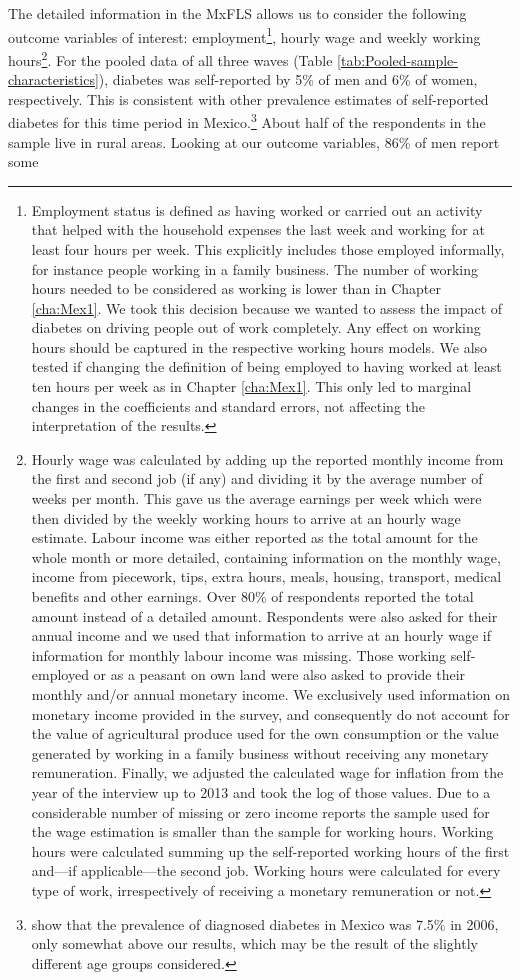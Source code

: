 The detailed information in the \ac{MxFLS} allows us to consider the following outcome variables of interest: employment\footnote{Employment status is defined as having worked or carried out an activity that helped with the household expenses the last week and working for at least four hours per week. This explicitly includes those employed informally, for instance people working in a family business. The number of working hours needed to be considered as working is lower than in Chapter \ref{cha:Mex1}. We took this decision because we wanted to assess the impact of diabetes on driving people out of work completely. Any effect on working hours should be captured in the respective working hours models. We also tested if changing the definition of being employed to having worked at least ten hours per week as in Chapter \ref{cha:Mex1}. This only led to marginal changes in the coefficients and standard errors, not affecting the interpretation of the results.}, hourly wage and weekly working hours\footnote{Hourly wage was calculated by adding up the reported monthly income from the first and second job (if any) and dividing it by the average number of weeks per month. This gave us the average earnings per week which were then divided by the weekly working hours to arrive at an hourly wage estimate. Labour income was either reported as the total amount for the whole month or more detailed, containing information on the monthly wage, income from piecework, tips, extra hours, meals, housing, transport, medical benefits and other earnings. Over 80\% of respondents reported the total amount instead of a detailed amount. Respondents were also asked for their annual income and we used that information to arrive at an hourly wage if information for monthly labour income was missing. Those working self-employed or as a peasant on own land were also asked to provide their monthly and/or annual monetary income. We exclusively used information on monetary income provided in the survey, and consequently do not account for the value of agricultural produce used for the own consumption or the value generated by working in a family business without receiving any monetary remuneration.  Finally, we adjusted the calculated wage for inflation from the year of the interview up to 2013 and took the log of those values. Due to a considerable number of missing or zero income reports the sample used for the wage estimation is smaller than the sample for working hours. Working hours were calculated summing up the self-reported working hours of the first and---if applicable---the second job. Working hours were calculated for every type of work, irrespectively of receiving a monetary remuneration or not.}. For the pooled data of all three waves (Table  \ref{tab:Pooled-sample-characteristics}), diabetes was self-reported by 5\% of men and 6\% of women, respectively. This is consistent with other prevalence estimates of self-reported diabetes for this time period in Mexico.\footnote{\textcite{Barquera2013} show that the prevalence of diagnosed diabetes in Mexico was 7.5\% in 2006, only somewhat above our results, which may be the result of the slightly different age groups considered.}  About half of the respondents in the sample live in rural areas. Looking at our outcome variables, 86\% of men report some 